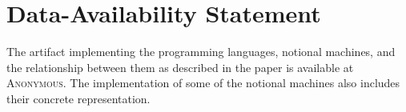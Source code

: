 \section*{Data-Availability Statement}
The artifact implementing
the programming languages, notional machines, and the relationship between them as described in the paper
is available at
\textsc{Anonymous}.
The implementation of some of the notional machines also includes their concrete representation.

